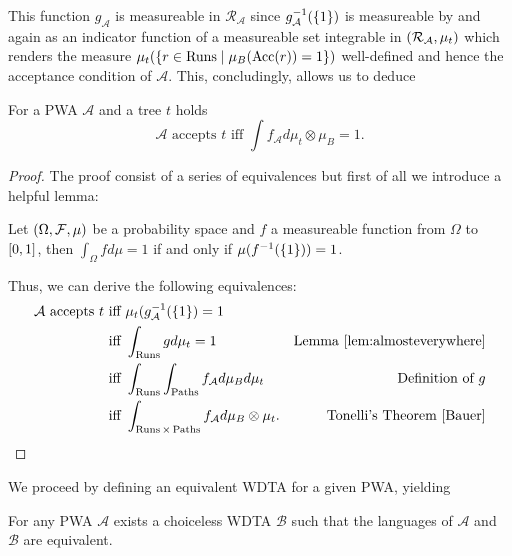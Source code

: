 This function $g_{\mathcal{A}}$ is measureable in $\mathcal{R}_{\mathcal{A}}$
since $g_{\mathcal{A}}^{-1}(\left\{1\right\})$ is measureable by \cite[Lemma 23.1]{Bauer}
and again as an indicator function of a measureable set integrable in
$\left(\mathcal{R}_{\mathcal{A}},\mu_{t}\right)$ which renders the measure
$\mu_{t}(\left\{r\in\operatorname{Runs}\mid\mu_{B}(\operatorname{Acc}(r)) = 1 \right\})$ well-defined and hence the
acceptance condition of $\mathcal{A}$. This, concludingly, allows us to deduce
\begin{proposition}
  For a \ac{PWA} $\mathcal{A}$ and a tree $t$ holds
  \begin{equation*}
    \mathcal{A}\text{ accepts }t
    \text{ iff }
    \int f_{\mathcal{A}} d\mu_{t}\otimes\mu_{B} = 1.
  \end{equation*}
  \label{prop:pwabyf}
\end{proposition}
\begin{proof}
  The proof consist of a series of equivalences but first of all we introduce
  a helpful lemma:
  \begin{lemma}
    \cite[Lemma 40]{RandAutoInfTrees} Let $\left(\Omega,\mathcal{F},\mu\right)$ be
    a probability space and $f$ a measureable function from $\Omega$ to
    $\left[0,1\right]$, then $\int_{\Omega}f d\mu = 1$ if and only if 
    $\mu(f^{-1}(\left\{1\right\})) = 1$.
    \label{lem:almosteverywhere}
  \end{lemma}
  Thus, we can derive the following equivalences:
  \begin{align*}
    \mathcal{A}\text{ accepts }t
     &\text{ iff }\mu_{t}(g_{\mathcal{A}}^{-1}(\set{1}) = 1&\\
    &\text{ iff }\int_{\Runs} g d\mu_{t} = 1
     &\text{Lemma \ref{lem:almosteverywhere}}\\
    &\text{ iff }\int_{\Runs}\int_{\Paths} f_{\mathcal{A}} d\mu_{B} d\mu_{t}
     &\text{Definition of }g\\
    &\text{ iff }\int_{\Runs\times\Paths}f_{\mathcal{A}}d\mu_{B}\otimes\mu_{t}.
     &\text{Tonelli's Theorem \cite[Theorem 23.6]{Bauer}}
  \end{align*}
\end{proof}
We proceed by defining an equivalent \ac{WDTA} for a given \ac{PWA}, yielding
\begin{theorem}
  For any \ac{PWA} $\mathcal{A}$ exists a choiceless \ac{WDTA} $\mathcal{B}$
  such that the languages of $\mathcal{A}$ and $\mathcal{B}$ are equivalent.
\end{theorem}
